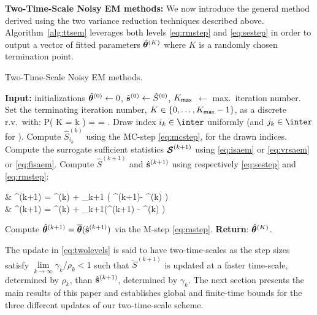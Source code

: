 \documentclass[11pt]{article}
\theoremstyle{t}
\begin{document}
\textbf{Two-Time-Scale Noisy EM methods:}
We now introduce the general method derived using the two variance reduction techniques described above.
Algorithm~\ref{alg:ttsem} leverages both levels \eqref{eq:rmstep} and \eqref{eq:sestep} in order to output a vector of fitted parameters $\hat{{\bm{\theta}}}^{(K)}$ where $K$ is a randomly chosen termination point.
\vspace{-.2cm}
\begin{algorithm}[H]
\caption{Two-Time-Scale Noisy EM methods.}\label{alg:ttsem}
  \begin{algorithmic}[1]
  \STATE \textbf{Input:} initializations $\hat{{\bm{\theta}}}^{(0)} \leftarrow 0$, $\hat{{\mathbf{s}}}^{(0)} \leftarrow \hat{S}^{(0)}$, $K_{\sf max}$ $\leftarrow$ max.~iteration number. \STATE Set the terminating iteration number, $K \in \{0,\dots,K_{\sf max}-1\}$, as a discrete r.v.~with:\vspace{-.1cm}
  \beq \label{eq:random}
   P( K = k ) =  = .\vspace{-.2cm} 
  \eeq
  \STATE Draw index $i_k \in \inter$ uniformly (and $j_k \in \inter$ for \FISAEM).
     \STATE Compute $\hat{S}_{i_k}^{(k)}$ using the {\sf MC-step} \eqref{eq:mcstep},  for the drawn indices.
   \STATE Compute the surrogate sufficient statistics ${\bm{\mathcal{S}}}^{(k+1)}$ using \eqref{eq:isaem} or \eqref{eq:vrsaem} or \eqref{eq:fisaem}.
   \STATE Compute $\hat{S}^{(k+1)}$ and $\hat{{\mathbf{s}}}^{(k+1)}$ using respectively \eqref{eq:sestep} and \eqref{eq:rmstep}:
\beq \label{eq:twolevels}
\begin{split}
& ^{(k+1)} = ^{(k)} + \rho_{k+1} \big( \StocEstep^{(k+1)}- ^{(k)}  \big)\\
&  \hat{\bss}^{(k+1)} =  \hat{\bss}^{(k)}  + \gamma_{k+1}(^{(k+1)} - \hat{\bss}^{(k)} )
\end{split}
\eeq
   \STATE Compute $\hat{{\bm{\theta}}}^{(k+1)} = \overline{{\bm{\theta}}}(  \hat{{\mathbf{s}}}^{(k+1)}) $ via the {\sf M-step} \eqref{eq:mstep}.
\ENDFOR
\STATE \textbf{Return}: $\hat{{\bm{\theta}}}^{(K)}$.
  \end{algorithmic}
\end{algorithm}
\vspace{-.2cm}
The update in \eqref{eq:twolevels} is said to have two-time-scales as the step sizes satisfy $\lim \limits_{k \to \infty} \gamma_k/\rho_k < 1$ such that $ \tilde{S}^{(k+1)} $  is updated at a faster time-scale, determined by $\rho_k$, than $\hat{{\mathbf{s}}}^{(k+1)}$, determined by $\gamma_k$.
The next section presents the main results of this paper and establishes global and finite-time bounds for the three different updates of our two-time-scale scheme.
\vspace{-.2cm}
\end{document}
